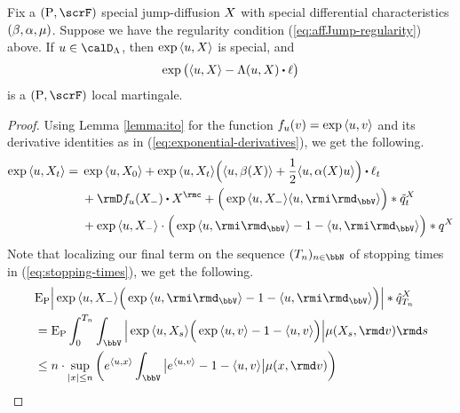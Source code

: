 \begin{proposition}
  \label{proposition:LK-real}
  Fix a $(\Prb, \scrF)$ special jump-diffusion $X$ with special differential characteristics $(\beta, \alpha, \mu)$.
  Suppose we have the regularity condition (\ref{eq:affJump-regularity}) above.
  If $\momentVar \in \odeSpace$, then $\exp{\langle u, X\rangle}$ is special, and 
  \[
    \exp\big( \prj\momentVar\X - \ode(\momentVar, \X) \shortInt \leb \big)
  \]
  is a $(\Prb, \scrF)$ local martingale.
\end{proposition}
\begin{proof}
  \label{proposition:LK-real}
  Using Lemma \ref{lemma:ito} for the function $f_u(v) = \exp{\langle u, v\rangle}$ and its derivative identities as in (\ref{eq:exponential-derivatives}), we get the following.
  \begin{equation}
    \label{eq:LK-ito-pause}
    \exp\prj{\momentVar}{\X_t}
    = \begin{aligned}[t]
      &\exp\prj{\momentVar}{\X_0} + \exp\prj{\momentVar}{\X_t} \Big( \prj{\momentVar}{\affDrift(\X)} + \frac12 \prj{\momentVar}{\affDiff(\X)\momentVar} \Big) \shortInt \leb_t \\
      &+ \Der f_\momentVar(\X_-) \shortInt \X^\rmc + \Big( \exp\prj{\momentVar}{\X_-} \prj{\momentVar}{\id_\vecSpace} \Big) \ast \compensate{\jumpMeas^\X}_t \\
      &+ \exp\prj{\momentVar}{\X_-} \cdot \Big( \exp\prj{\momentVar}{\id_\vecSpace} - 1 - \prj{\momentVar}{\id_\vecSpace} \Big) \ast \jumpMeas^\X
    \end{aligned}
  \end{equation}
  Note that localizing our final term on the sequence $(T_n)_{n\in\bbN}$ of stopping times in (\ref{eq:stopping-times}), we get the following.
  \begin{align*}
    &\Exp_\Prb  \Big| \exp\prj{\momentVar}{\X_-} \Big( \exp\prj{\momentVar}{\id_\vecSpace} - 1 - \prj{\momentVar}{\id_\vecSpace} \Big) \Big| \ast \predproj{\jumpMeas^\X}_{T_n} \\
    &= \Exp_\Prb \int_0^{T_n} \int_\vecSpace \Big| \exp\prj{\momentVar}{\X_s} \Big( \exp\prj{\momentVar}{\markVar} - 1 - \prj{\momentVar}{\markVar} \Big) \Big| \affJump(\X_s, \rmd\markVar) \rmd s \\
    &\leq n \cdot \sup_{|\stateVar|\leq n} \bigg( e^\prj\momentVar\stateVar \int_\vecSpace \big| e^\prj{\momentVar}{\markVar} - 1 - \prj{\momentVar}{\markVar} \big| \affJump(\stateVar, \rmd\markVar) \bigg)
  \end{align*}

\end{proof}
